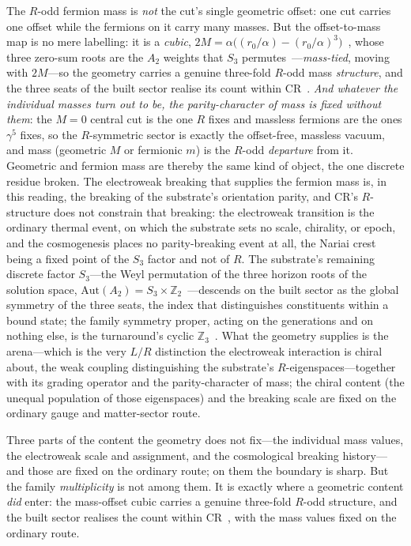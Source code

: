 \documentclass[11pt]{article}
\theoremstyle{plain}
\theoremstyle{remark}
\begin{document}
The $R$-odd fermion mass is \emph{not} the cut's single geometric offset: one cut carries one offset while the fermions on it carry many masses. But the offset-to-mass map is no mere labelling: it is a \emph{cubic}, $2M=\alpha\bigl((r_0/\alpha)-(r_0/\alpha)^3\bigr)$~\cite{JanzenOperator}, whose three zero-sum roots are the $A_2$ weights that $S_3$ permutes~\cite{JanzenAlgebroid}---\emph{mass-tied}, moving with $2M$---so the geometry carries a genuine three-fold $R$-odd mass \emph{structure}, and the three seats of the built sector realise its count within CR~\cite{JanzenMatter}. \emph{And whatever the individual masses turn out to be, the parity-character of mass is fixed without them}: the $M=0$ central cut is the one $R$ fixes and massless fermions are the ones $\gamma^5$ fixes, so the $R$-symmetric sector is exactly the offset-free, massless vacuum, and mass (geometric $M$ or fermionic $m$) is the $R$-odd \emph{departure} from it. Geometric and fermion mass are thereby the same kind of object, the one discrete residue broken. The electroweak breaking that supplies the fermion mass is, in this reading, the breaking of the substrate's orientation parity, and CR's $R$-structure does not constrain that breaking: the electroweak transition is the ordinary thermal event, on which the substrate sets no scale, chirality, or epoch, and the cosmogenesis places no parity-breaking event at all, the Nariai crest being a fixed point of the $S_3$ factor and not of $R$. The substrate's remaining discrete factor $S_3$---the Weyl permutation of the three horizon roots of the solution space, $\mathrm{Aut}(A_2)=S_3\times\mathbb{Z}_2$~\cite{JanzenAlgebroid}---descends on the built sector as the global symmetry of the three seats, the index that distinguishes constituents within a bound state; the family symmetry proper, acting on the generations and on nothing else, is the turnaround's cyclic $\mathbb{Z}_3$~\cite{JanzenMatter}. What the geometry supplies is the arena---which is the very $L/R$ distinction the electroweak interaction is chiral about, the weak coupling distinguishing the substrate's $R$-eigenspaces---together with its grading operator and the parity-character of mass; the chiral content (the unequal population of those eigenspaces) and the breaking scale are fixed on the ordinary gauge and matter-sector route.

Three parts of the content the geometry does not fix---the individual mass values, the electroweak scale and assignment, and the cosmological breaking history---and those are fixed on the ordinary route; on them the boundary is sharp. But the family \emph{multiplicity} is not among them. It is exactly where a geometric content \emph{did} enter: the mass-offset cubic carries a genuine three-fold $R$-odd structure, and the built sector realises the count within CR~\cite{JanzenMatter}, with the mass values fixed on the ordinary route.
\end{document}
